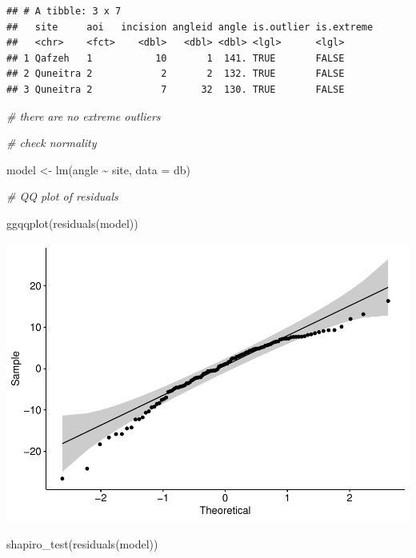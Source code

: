 \documentclass[
]{article}
\newenvironment{Shaded}{\begin{snugshade}}{\end{snugshade}}
\newcommand{\AttributeTok}[1]{\textcolor[rgb]{0.77,0.63,0.00}{#1}}
\newcommand{\CommentTok}[1]{\textcolor[rgb]{0.56,0.35,0.01}{\textit{#1}}}
\newcommand{\FunctionTok}[1]{\textcolor[rgb]{0.00,0.00,0.00}{#1}}
\newcommand{\NormalTok}[1]{#1}
\newcommand{\OtherTok}[1]{\textcolor[rgb]{0.56,0.35,0.01}{#1}}
\newcommand{\SpecialCharTok}[1]{\textcolor[rgb]{0.00,0.00,0.00}{#1}}
\begin{document}
\begin{verbatim}
## # A tibble: 3 x 7
##   site     aoi   incision angleid angle is.outlier is.extreme
##   <chr>    <fct>    <dbl>   <dbl> <dbl> <lgl>      <lgl>     
## 1 Qafzeh   1           10       1  141. TRUE       FALSE     
## 2 Quneitra 2            2       2  132. TRUE       FALSE     
## 3 Quneitra 2            7      32  130. TRUE       FALSE
\end{verbatim}

\begin{Shaded}
\begin{Highlighting}[]
\CommentTok{\# there are no extreme outliers}

\CommentTok{\# check normality}

\NormalTok{model }\OtherTok{\textless{}{-}} \FunctionTok{lm}\NormalTok{(angle }\SpecialCharTok{\textasciitilde{}}\NormalTok{ site, }\AttributeTok{data =}\NormalTok{ db)}

\CommentTok{\# QQ plot of residuals}

\FunctionTok{ggqqplot}\NormalTok{(}\FunctionTok{residuals}\NormalTok{(model))}
\end{Highlighting}
\end{Shaded}

\includegraphics{incisionangles_files/figure-latex/unnamed-chunk-6-2.pdf}

\begin{Shaded}
\begin{Highlighting}[]
\FunctionTok{shapiro\_test}\NormalTok{(}\FunctionTok{residuals}\NormalTok{(model))}
\end{Highlighting}
\end{Shaded}
\end{document}
